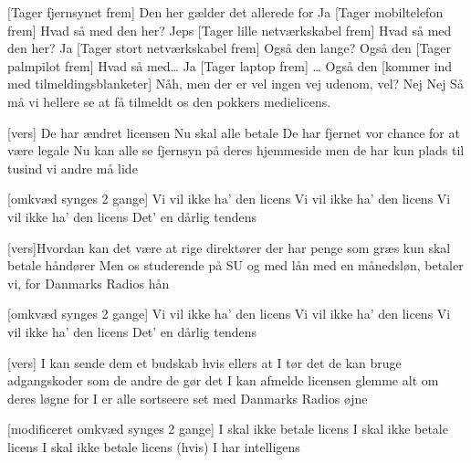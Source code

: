 \documentclass[a4paper,11pt]{article}
\begin{document}
\begin{song}

[Tager fjernsynet frem] Den her gælder det allerede for
 Ja
[Tager mobiltelefon frem] Hvad så med den her?
 Jeps
[Tager lille netværkskabel frem] Hvad så med den her?
 Ja
[Tager stort netværkskabel frem] Også den lange?
 Også den
[Tager palmpilot frem] Hvad så med\ldots
{} Ja
[Tager laptop frem] \ldots
{} Også den
[kommer ind med tilmeldingsblanketer] Nåh, men der er vel
ingen vej udenom, vel?
 Nej
 Nej
 Så må vi hellere se at få tilmeldt os den pokkers
           medielicens.

[vers] De har ændret licensen
Nu skal alle betale
De har fjernet vor chance
for at være legale
Nu kan alle se fjernsyn
på deres hjemmeside
men de har kun plads til tusind
vi andre må lide

[omkvæd synges 2 gange] Vi vil ikke ha' den licens
Vi vil ikke ha' den licens
Vi vil ikke ha' den licens
Det' en dårlig tendens 

[vers]Hvordan kan det være
at rige direktører
der har penge som græs
kun skal betale håndører
Men os studerende
på SU og med lån
med en månedsløn, betaler vi, for Danmarks Radios hån

[omkvæd synges 2 gange] Vi vil ikke ha' den licens
Vi vil ikke ha' den licens
Vi vil ikke ha' den licens
Det' en dårlig tendens 

[vers] I kan sende dem et budskab
hvis ellers at I tør det
de kan bruge adgangskoder
som de andre de gør det
I kan afmelde licensen
glemme alt om deres løgne
for I er alle sortseere
set med Danmarks Radios øjne

[modificeret omkvæd synges 2 gange] I skal ikke betale licens
I skal ikke betale licens
I skal ikke betale licens
(hvis) I har intelligens


\end{song}
\end{document}

